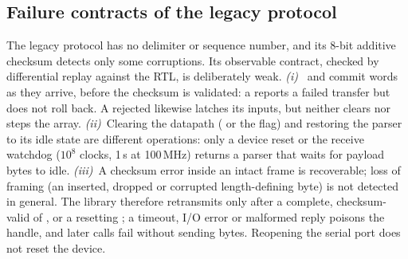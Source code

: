 \subsection{Failure contracts of the legacy protocol}
\label{sec:contracts}

The legacy protocol has no delimiter or sequence number, and its 8-bit
additive checksum detects only some corruptions. Its observable contract,
checked by differential replay against the RTL, is deliberately weak.
\emph{(i)}~ and  commit words as they arrive, before the
checksum is validated: a  reports a failed transfer but does not
roll back. A rejected  likewise latches its inputs, but neither
clears nor steps the array. \emph{(ii)}~Clearing the datapath ( or
the  flag) and restoring the parser to its idle state are different
operations: only a device reset or the receive watchdog ($10^{8}$ clocks,
1\,s at 100\,MHz) returns a parser that waits for payload bytes to idle.
\emph{(iii)}~A checksum error inside an intact frame is recoverable; loss of
framing (an inserted, dropped or corrupted length-defining byte) is not
detected in general. The library therefore retransmits only after a
complete, checksum-valid  of ,  or a resetting
; a timeout, I/O error or malformed reply poisons the handle, and
later calls fail without sending bytes. Reopening the serial port does not
reset the device.
